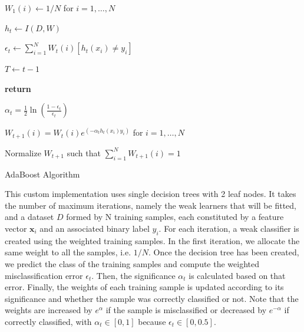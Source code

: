 \documentclass[conference]{IEEEtran}
\begin{document}
\begin{algorithm}
  $W_1(i) \leftarrow 1/N$ for $i=1,\dots,N$ %

    {
        $h_t \leftarrow I(D,W)$

        $\epsilon_t \leftarrow \sum^N_{i=1}W_t(i)[h_t(x_i)\neq y_i]$

        		{
		
		$T \leftarrow t-1$
		
		\bf{return}
		}
		
	$\alpha_t = \frac{1}{2}\ln \left( \frac{1-\epsilon_t}{\epsilon_t} \right)$
	
	
	 $W_{t+1}(i) = W_t(i) e^{(-\alpha_th_t(x_i)y_i)}$ for $i=1,\dots,N$
	
	 Normalize $W_{t+1}$ such that $\sum^N_{i=1}W_{t+1}(i)=1$
	
    }
\caption{AdaBoost Algorithm}
\end{algorithm}

This custom implementation uses single decision trees with 2 leaf nodes. It takes the number of maximum iterations, namely the weak learners that will be fitted, and a dataset $D$ formed by N training samples, each constituted by a feature vector $\boldsymbol{x}_i$ and an associated binary label $y_i$. For each iteration, a weak classifier is created using the weighted training samples. In the first iteration, we allocate the same weight to all the samples, i.e. $1/N$. Once the decision tree has been created, we predict the class of the training samples and compute the weighted misclassification error $\epsilon_t$. Then, the significance $\alpha_t$ is calculated based on that error. Finally, the weights of each training sample is updated according to its significance and whether the sample was correctly classified or not. Note that the weights are increased by $e^{\alpha}$ if the sample is misclassified or decreased by $e^{-\alpha}$ if correctly classified, with  $\alpha_t \in [0,1]$ because $\epsilon_t \in [0,0.5]$.
\end{document}
